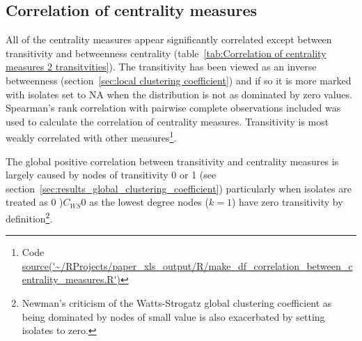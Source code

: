 \subsection{Correlation of centrality measures}

All of the centrality measures appear significantly correlated except between transitivity and betweenness centrality (table~\ref{tab:Correlation of centrality measures 2 transitvities}). The transitivity has been viewed as an inverse betweenness (section~\ref{sec:local clustering coefficient}) and if so it is more marked with isolates set to NA when the distribution is not as dominated by zero values. Spearman's rank correlation with pairwise complete observations included was used to calculate the correlation of centrality measures. Transitivity is most weakly correlated with other measures\footnote{Code \url{source('~/RProjects/paper_xls_output/R/make_df_correlation_between_centrality_measures.R')}}.

The global positive correlation between transitivity and centrality measures is largely caused by nodes of transitivity 0 or 1 (see section~\ref{sec:results_global_clustering_coefficient}) particularly when isolates are treated as 0 )$C_{WS}0$ as the lowest degree nodes ($k=1$) have zero transitivity by definition\footnote{Newman's criticism of the Watts-Strogatz global clustering coefficient as being dominated by nodes of small value is also exacerbated by setting isolates to zero.}.





